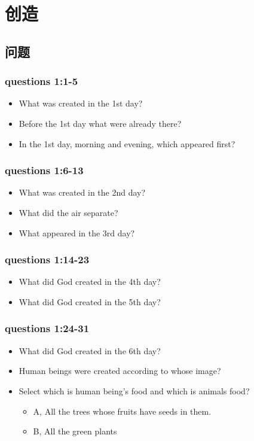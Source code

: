 


\chapter{创造}

\section{问题}
\subsection{questions 1:1-5}
\begin{itemize}
\item What was created in the 1st day? 
\item Before the 1st day what were already there? 
\item In the 1st day, morning and evening, which appeared first?
\end{itemize}

\subsection{questions 1:6-13}
\begin{itemize}
\item What was created in the 2nd day?
\item What did the air separate?
\item What appeared in the 3rd day?
\end{itemize}

\subsection{questions 1:14-23}
\begin{itemize}
\item What did God created in the 4th day?
\item What did God created in the 5th day?
\end{itemize}


\subsection{questions 1:24-31}
\begin{itemize}
\item What did God created in the 6th day?
\item Human beings were created according to whose image?
\item Select which is human being’s food and which is animals food?
\begin{itemize}
\item A, All the trees whose fruits have seeds in them. 
\item B, All the green plants
\end{itemize}
\end{itemize}

